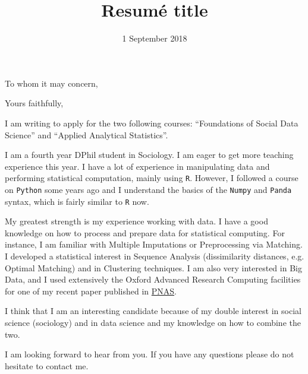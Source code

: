 \documentclass[11pt,a4paper,sans]{moderncv}        %
\title{Resumé title}                               %
\begin{document}
\recipient{}{}
\date{1 September 2018}
\opening{To whom it may concern,}
\closing{Yours faithfully,}
\makelettertitle


I am writing to apply for the two following courses: “Foundations of Social Data Science” and “Applied Analytical Statistics”. 

I am a fourth year DPhil student in Sociology. I am eager to get more teaching experience this year. I have a lot of experience in manipulating data and performing statistical computation, mainly using \texttt{R}. However, I followed a course on \texttt{Python} some years ago and I understand the basics of the \texttt{Numpy} and \texttt{Panda} syntax, which is fairly similar to \texttt{R} now. 

My greatest strength is my experience working with data. I have a good knowledge on how to process and prepare data for statistical computing. For instance, I am familiar with Multiple Imputations or Preprocessing via Matching. I developed a statistical interest in Sequence Analysis (dissimilarity distances, e.g. Optimal Matching) and in Clustering techniques. I am also very interested in Big Data, and I used extensively the Oxford Advanced Research Computing facilities for one of my recent paper published in \href{http://www.pnas.org/content/early/2018/05/29/1718020115.short}{PNAS}. 

I think that I am an interesting candidate because of my double interest in social science (sociology) and in data science and my knowledge on how to combine the two.   

I am looking forward to hear from you. 
If you have any questions please do not hesitate to contact me. 

\makeletterclosing
\end{document}
